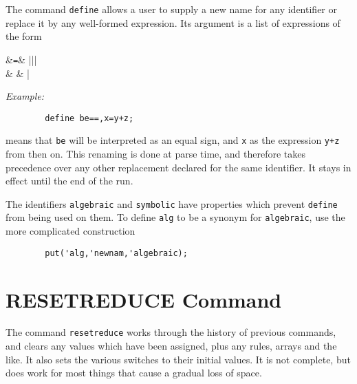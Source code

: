 The command \texttt{define} allows a user to supply a new name for
any identifier or replace it by any well-formed expression.  Its argument
is a list of expressions of the form
\begin{syntaxtable}
   &\texttt{=}& |||\\
                    &          & |
\end{syntaxtable}

\textit{Example:}
\begin{verbatim}
        define be==,x=y+z;
\end{verbatim}
means that \texttt{be} will be interpreted as an equal sign, and \texttt{x}
as the expression \texttt{y+z} from then on.  This renaming is done at parse
time, and therefore takes precedence over any other replacement declared
for the same identifier.  It stays in effect until the end of the
{\REDUCE} run.

The identifiers \texttt{algebraic} and \texttt{symbolic} have properties which
prevent \texttt{define} from being used on them.  To define
\texttt{alg} to be a synonym for \texttt{algebraic}, use the more complicated
construction
\begin{verbatim}
        put('alg,'newnam,'algebraic);
\end{verbatim}

\section{RESETREDUCE Command}
\hypertarget{command:RESETREDUCE}{}

The command \texttt{resetreduce} works through the
history of previous commands, and clears any values which have been
assigned, plus any rules, arrays and the like.  It also sets the various
switches to their initial values.  It is not complete, but does work for
most things that cause a gradual loss of space.
